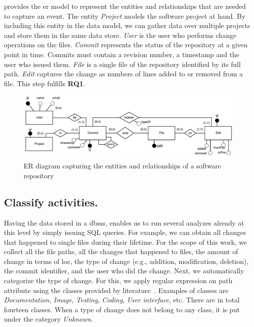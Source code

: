  provides the \gls{er} model to represent the entities and relationships that are needed to capture an event. The entity \textsl{Project} models the software project at hand. By including this entity in the data model, we can gather data over multiple projects and store them in the same data store. \textsl{User} is the user who performs change operations on the files. \textsl{Commit} represents the status of the repository at a given point in time. Commits must contain a revision number, a timestamp and the user who issued them. \textsl{File} is a single file of the repository identified by its full path. \textsl{Edit} captures the change as numbers of lines added to or removed from a file. This step fulfills \textbf{RQ1}.

\begin{figure}[]
    \centering
    \includegraphics[width=\textwidth]{figures/CommitLogER}
    \caption{ER diagram capturing the entities and relationships of a software repository}
    \label{fig:er-diagram}
\end{figure}


\subsection{Classify activities.}

Having the data stored in a \gls{dbms}, enables us to run several analyzes already at this level by simply issuing SQL queries. For example, we can obtain all changes that happened to single files during their lifetime. For the scope of this work, we collect all the file paths, all the changes that happened to files, the amount of change in terms of \gls{loc}, the type of change (e.g., addition, modification, deletion), the commit identifier, and the user who did the change. 
Next, we automatically categorize the type of change. For this, we apply regular expression on path attribute using the classes provided by literature~\citep{DBLP:journals/ese/VasilescuSGM14}. 
Examples of classes are  \textsl{Documentation}, \textsl{Image}, \textsl{Testing}, \textsl{Coding}, \textsl{User interface}, etc. There are in total fourteen classes. When a type of change does not belong to any class, it is put under the category \textsl{Unknown}.

